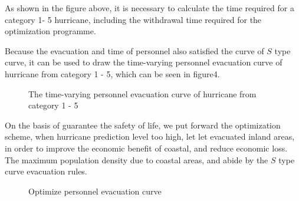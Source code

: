 \documentclass{mcmthesis}
\begin{document}
As shown in the figure above, it is necessary to calculate the time required for a category 1- 5 hurricane, including the withdrawal time required for the optimization programme.

Because the evacuation and time of personnel also satisfied the curve of $S$ type curve, it can be used to draw the time-varying personnel evacuation curve of hurricane from category 1 - 5, which can be seen in figure4.

\begin{figure}[h]
  \caption{The time-varying personnel evacuation curve of hurricane from category 1 - 5}\label{figure4}
\end{figure}

On the basis of guarantee the safety of life, we put forward the optimization scheme, when hurricane prediction level too high, let let evacuated inland areas, in order to improve the economic benefit of coastal, and reduce economic loss. The maximum population density due to coastal areas, and abide by the $S$ type curve evacuation rules.

\begin{figure}[h]
  \caption{Optimize personnel evacuation curve}\label{figure5}
\end{figure}
\end{document}
